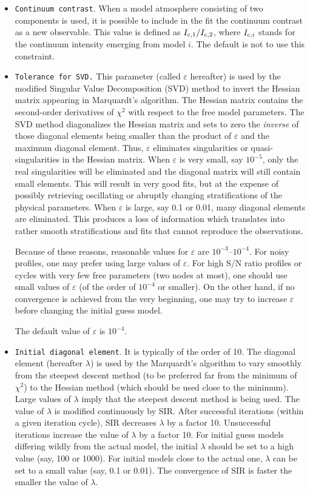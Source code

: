 \begin{itemize}
\item {\tt Continuum contrast}. When a model atmosphere consisting of
two components is used, it is possible to include in the fit the
continuum contrast as a new observable.  This value is defined as
$I_{{\rm c},1}/I_{{\rm c},2}$, where $I_{{\rm c},i}$ stands for the
continuum intensity emerging from model $i$. The default is not to use
this constraint.

\item {\tt Tolerance for SVD.} This parameter (called $\varepsilon$
hereafter) is used by the modified Singular Value Decomposition (SVD)
method to invert the Hessian matrix appearing in Marquardt's algorithm.
The Hessian matrix contains the second-order derivatives of $\chi^2$
with respect to the free model parameters. The SVD method diagonalizes
the Hessian matrix and sets to zero the {\em inverse} of those diagonal
elements being smaller than the product of $\varepsilon$ and the
maximum diagonal element.  Thus, $\varepsilon$ eliminates singularities
or quasi-singularities in the Hessian matrix.  When $\varepsilon$ is
very small, say $10^{-5}$, only the real singularities will be
eliminated and the diagonal matrix will still contain small elements.
This will result in very good fits, but at the expense of possibly
retrieving oscillating or abruptly changing stratifications of the
physical parameters. When $\varepsilon$ is large, say 0.1 or 0.01, many
diagonal elements are eliminated. This produces a loss of information
which translates into rather smooth stratifications and fits that
cannot reproduce the observations.

Because of these reasons, reasonable values for $\varepsilon$ are
$10^{-3}$--$10^{-4}$.  For noisy profiles, one may prefer using large
values of $\varepsilon$. For high S/N ratio profiles or cycles with
very few free parameters (two nodes at most), one should use small
values of $\varepsilon$ (of the order of $10^{-4}$ or smaller). On the
other hand, if no convergence is achieved from the very beginning, one 
may try to increase $\varepsilon$ before changing the initial guess model. 

The default value of $\varepsilon$ is $10^{-4}$. 
 
\item {\tt Initial diagonal element}. It is typically of the order of
10. The diagonal element (hereafter $\lambda$) is used by the
Marquardt's algorithm to vary smoothly from the steepest descent method
(to be preferred far from the minimum of $\chi^2$) to the Hessian
method (which should be used close to the minimum). Large values of $\lambda$ 
imply that the steepest descent method is being used. The value of $\lambda$ 
is modified continuously by SIR. After successful iterations (within a given 
iteration cycle), SIR decreases $\lambda$ by a factor 10. Unsuccessful 
iterations increase the value of $\lambda$ by a factor 10. For initial
guess models differing wildly from the actual model, the initial $\lambda$
should be set to a high value (say, 100 or 1000). For initial models close
to the actual one, $\lambda$ can be set to a small value (say, 0.1 or 0.01). 
The convergence of SIR is faster the smaller the value of $\lambda$. 


\end{itemize}
